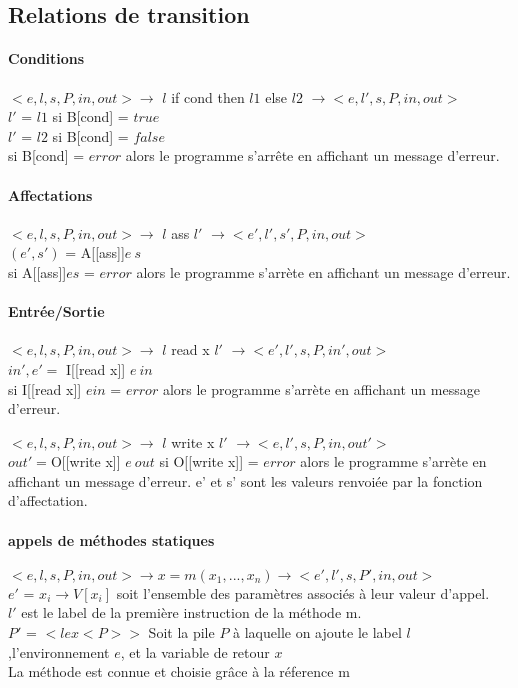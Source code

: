\subsection{Relations de transition}
\paragraph{Conditions}
$<e,l,s,P,in,out> \rightarrow$ $l$ if cond then $l1$ else $l2$  $\rightarrow <e,l',s,P,in,out>$\\
$l'$ = $l1$ si B[cond] = $true$\\
$l'$ = $l2$ si B[cond] = $false$\\
si B[cond]  = $error$ alors le programme s'arrête en affichant un message d'erreur.

\paragraph{Affectations}
$<e,l,s,P,in,out> \rightarrow$ $l$ ass $l'$ $\rightarrow <e',l',s',P,in,out>$\\
$(e',s')$ = A[[ass]]$ e\: s$\\
si A[[ass]]$ e s$ = $error$ alors le programme s'arrète en affichant un message d'erreur.

\paragraph{Entrée/Sortie} 
$<e,l,s,P,in,out> \rightarrow$ $l$ read x $l'$  $\rightarrow <e',l',s,P,in',out>$\\
$in',e' = $ I[[read x]] $e\: in$\\
si I[[read x]] $e in$ = $error$ alors le programme s'arrète en affichant un message d'erreur.

$<e,l,s,P,in,out> \rightarrow$ $l$ write x $l'$  $\rightarrow <e,l',s,P,in,out'>$\\
$out' = $O[[write x]] $e\: out$
si O[[write x]] = $error$ alors le programme s'arrète en affichant un message d'erreur. 
e' et s' sont les valeurs renvoiée par la fonction d'affectation.

\paragraph{appels de méthodes statiques}
$<e,l,s,P,in,out> \rightarrow x = m(x_1,...,x_n) \rightarrow <e',l',s,P',in,out>$\\
$e'$ = $x_i \rightarrow V[x_i]$ soit l'ensemble des paramètres associés à leur valeur d'appel. \\
$l'$ est le label de la première instruction de la méthode m.\\
$P'$ = $ < l e x <P>>$ Soit la pile $P$ à laquelle on ajoute le label $l$,l'environnement $e$, et la variable de retour $x$\\
La méthode est connue et choisie grâce à la réference m

